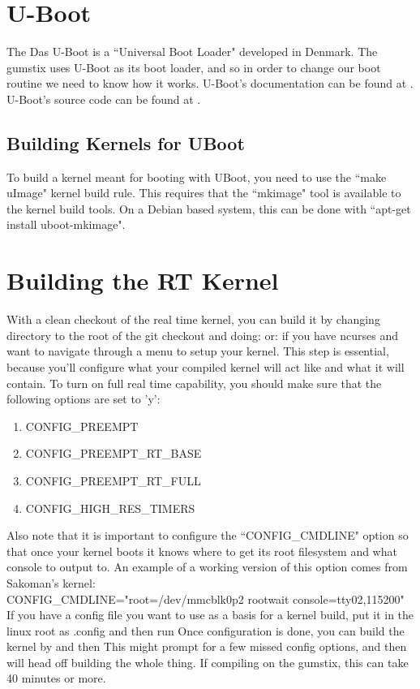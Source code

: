 \section{U-Boot}
The Das U-Boot is a ``Universal Boot Loader" \cite{UBoot} developed in Denmark.  The gumstix uses U-Boot as its boot loader, and so in order to change our boot routine we need to know how it works.  U-Boot's documentation can be found at \cite{UBootDocs}. U-Boot's source code can be found at \cite{UBootSource}.
\subsection{Building Kernels for UBoot}
To build a kernel meant for booting with UBoot, you need to use the ``make uImage" kernel build rule.  This requires that the ``mkimage" tool is available to the kernel build tools.  On a Debian based system, this can be done with ``apt-get install uboot-mkimage".
\section{Building the RT Kernel}
With a clean checkout of the real time kernel, you can build it by changing directory to the root of the git checkout and doing:  or:  if you have ncurses and want to navigate through a menu to setup your kernel.  This step is essential, because you'll configure what your compiled kernel will act like and what it will contain.  To turn on full real time capability, you should make sure that the following options are set to 'y':
\begin{enumerate}
\item CONFIG\_PREEMPT
\item CONFIG\_PREEMPT\_RT\_BASE
\item CONFIG\_PREEMPT\_RT\_FULL
\item CONFIG\_HIGH\_RES\_TIMERS
\end{enumerate}

Also note that it is important to configure the ``CONFIG\_CMDLINE" option so that once your kernel boots it knows where to get its root filesystem and what console to output to.  An example of a working version of this option comes from Sakoman's kernel:\\
\indent\indent CONFIG\_CMDLINE="root=/dev/mmcblk0p2 rootwait console=tty02,115200"
\\
If you have a config file you want to use as a basis for a kernel build, put it in the linux root as .config and then run 
Once configuration is done, you can build the kernel by  and then   This might prompt for a few missed config options, and then will head off building the whole thing.  If compiling on the gumstix, this can take 40 minutes or more.

